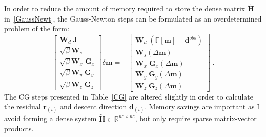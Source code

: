 In order to reduce the amount of memory required to store the dense matrix $ \mathbf{\tilde H}$ in~\ref{GaussNewt}, the Gauss-Newton steps can be formulated as an overdetermined problem of the form:
 \begin{equation}\label{eq:lsqr_dphi_dm}
 \begin{bmatrix}
\mathbf{W}_d \;\mathbf{J} \\
\sqrt{\beta} \mathbf{W}_s \\
\sqrt{\beta} \mathbf{W}_x \;\mathbf{G}_x \\
\sqrt{\beta} \mathbf{W}_y \;\mathbf{G}_y  \\
\sqrt{\beta} \mathbf{W}_z \;\mathbf{G}_z 
 \end{bmatrix} \delta \mathbf{m} =
  - \begin{bmatrix}
\mathbf{W}_d \;\left( \mathbb{F}[\mathbf{m}] - \mathbf{d}^{obs} \right)\\
\mathbf{W}_s \left( \Delta \mathbf{m} \right) \\
\mathbf{W}_x \;\mathbf{G}_x \left( \Delta \mathbf{m} \right)\\
\mathbf{W}_y \;\mathbf{G}_y \left( \Delta \mathbf{m} \right)\\
\mathbf{W}_z \;\mathbf{G}_z \left( \Delta \mathbf{m} \right)
 \end{bmatrix} \;.
 \end{equation}
The CG steps presented in Table~\ref{CG} are altered slightly in order to calculate the residual $\mathbf{r}_{(i)}$ and descent direction $\mathbf{d}_{(i)}$.
Memory savings are important as I avoid forming a dense system  $\mathbf{\tilde H} \in \mathbb{R}^{nc \times nc}$, but only require sparse matrix-vector products.

